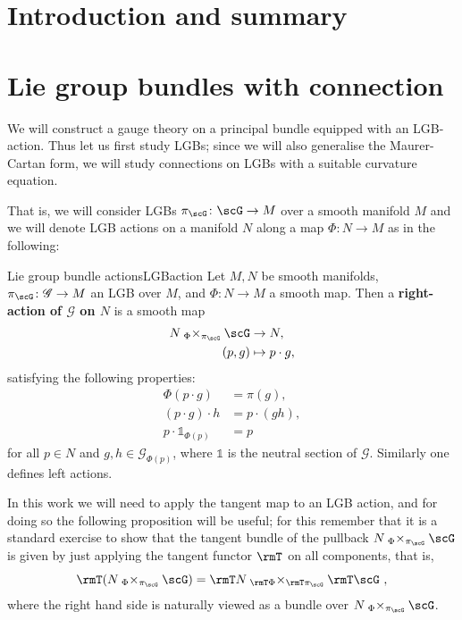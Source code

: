 \documentclass[reqno,a4paper,oneside]{amsart}
\newcommand\fibtimes[2]{\mathbin{_{#1}\times_{#2}}}
\theoremstyle{plain}
\theoremstyle{remark}
\theoremstyle{definition}
\begin{document}


\section{Introduction and summary}


\section{Lie group bundles with connection}

We will construct a gauge theory on a principal bundle equipped with an LGB-action. Thus let us first study LGBs; since we will also generalise the Maurer-Cartan form, we will study connections on LGBs with a suitable curvature equation. 

That is, we will consider LGBs $\pi_\scG\colon \scG \to M$ over a smooth manifold $M$ and we will denote LGB actions on a manifold $N$ along a map $\Phi\colon  N\to M$ as in the following:

\begin{definitions}{Lie group bundle actions}{LGBaction}
Let $M, N$ be smooth manifolds, $\pi_\scG \colon \mathscr{G} \to M$ an LGB over $M$, and $\Phi \colon N \to M$ a smooth map. Then a \textbf{right-action of $\mathscr{G}$ on $N$} is a smooth map 
\begin{align*}
N \fibtimes\Phi{\pi_\scG} \scG &\to N,\\
(p, g) &\mapsto p \cdot g,
\end{align*}
satisfying the following properties:
\begin{align*}
\Phi(p \cdot g) &= \pi(g),\\
(p \cdot g) \cdot h &= p \cdot (gh),\\
p \cdot \mathds{1}_{\Phi(p)} &= p
\end{align*}
for all $p \in N$ and $g, h \in \mathscr{G}_{\Phi(p)}$, where $\mathds{1}$ is the neutral section of $\mathscr{G}$. Similarly one defines left actions.
\end{definitions}

In this work we will need to apply the tangent map to an LGB action, and for doing so the following proposition will be useful; for this remember that it is a standard exercise to show that the tangent bundle of the pullback $N \fibtimes\Phi{\pi_\scG} \scG$ is given by just applying the tangent functor $\rmT$ on all components, that is,
\begin{equation*}
	\rmT \mleft( N \fibtimes\Phi{\pi_\scG} \scG \mright)
	=
	\rmT N \fibtimes{\rmT\Phi}{\rmT\pi_\scG} \rmT \scG~,
\end{equation*}
where the right hand side is naturally viewed as a bundle over $N \fibtimes\Phi{\pi_\scG} \scG$.
\end{document}
